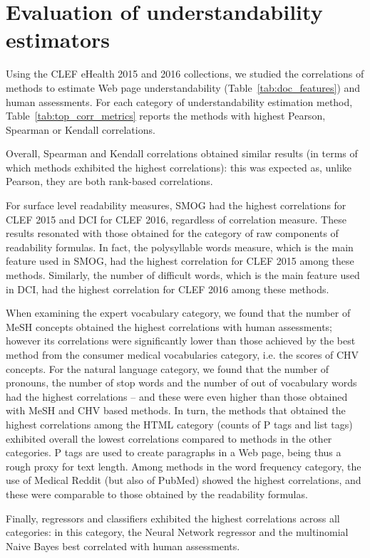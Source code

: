 \section{Evaluation of understandability estimators}
\label{sec:beyond_readability}
Using the CLEF eHealth 2015 and 2016 collections, we studied the correlations of methods to estimate Web page understandability (Table~\ref{tab:doc_features}) and human assessments. For each category of understandability estimation method, Table~\ref{tab:top_corr_metrics} reports the methods with highest Pearson, Spearman or Kendall correlations.

Overall, Spearman and Kendall correlations obtained similar results (in terms of which methods exhibited the highest correlations): this was expected as, unlike Pearson, they are both rank-based correlations.

For surface level readability measures, SMOG had the highest correlations for CLEF 2015 and DCI for CLEF 2016, regardless of correlation measure. These results resonated with those obtained for the category of raw components of readability formulas. In fact, the polysyllable words measure, which is the main feature used in SMOG, had the highest correlation for CLEF 2015 among these methods. Similarly, the number of difficult words, which is the main feature used in DCI, had the highest correlation for CLEF 2016 among these methods.

When examining the expert vocabulary category, we found that the number of MeSH concepts obtained the highest correlations with human assessments; however its correlations were significantly lower than those achieved by the best method from the consumer medical vocabularies category, i.e. the scores of CHV concepts. For the natural language category, we found that the number of pronouns, the number of stop words and the number of out of vocabulary words had the highest correlations -- and these were even higher than those obtained with MeSH and CHV based methods. In turn, the methods that obtained the highest correlations among the HTML category (counts of P tags and list tags) exhibited overall the lowest correlations compared to methods in the other categories. P tags are used to create paragraphs in a Web page, being thus a rough proxy for text length. 
Among methods in the word frequency category, the use of Medical Reddit (but also of PubMed) showed the highest correlations, and these were comparable to those obtained by the readability formulas. 

Finally, regressors and classifiers exhibited the highest correlations across all categories: in this  category, the  Neural Network regressor and the multinomial Naive Bayes best correlated with human assessments. 




